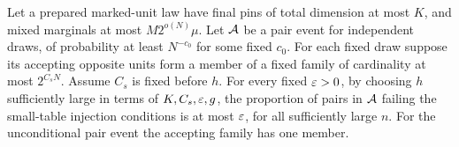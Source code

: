 \begin{lemma}
\label{lem:injection}
Let a prepared marked-unit law have final pins of total dimension
at most \(K\), and mixed marginals at most \(M2^{o(N)}\mu\).
Let \({\cal A}\) be a pair event for independent draws, of probability
at least \(N^{-c_0}\) for some fixed \(c_0\).
For each fixed draw suppose its accepting opposite units form a
member of a fixed family of cardinality at most \(2^{C_sN}\).
Assume \(C_s\) is fixed before \(h\).
For every fixed \(\varepsilon>0\), by choosing \(h\) sufficiently large
in terms of \(K,C_s,\varepsilon,g\), the proportion of pairs in
\({\cal A}\) failing the small-table injection conditions is at
most \(\varepsilon\), for all sufficiently large \(n\).
For the unconditional pair event the accepting family has one
member.
\end{lemma}

